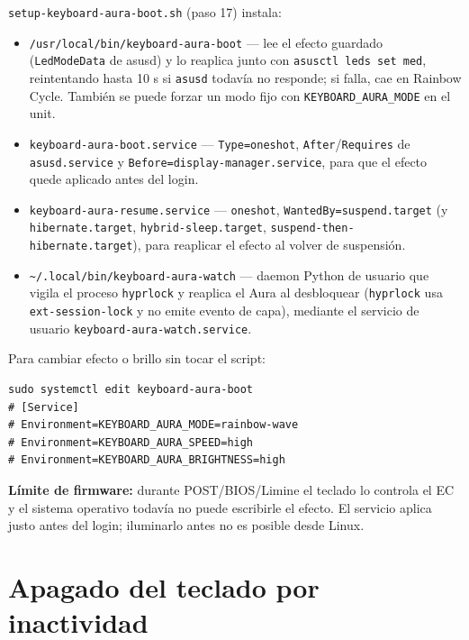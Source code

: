 \documentclass[12pt,a4paper]{article}
\begin{document}
\texttt{setup-keyboard-aura-boot.sh} (paso 17) instala:

\begin{itemize}[nosep]
  \item \texttt{/usr/local/bin/keyboard-aura-boot} — lee el efecto guardado
        (\texttt{LedModeData} de asusd) y lo reaplica junto con
        \texttt{asusctl leds set med}, reintentando hasta 10 s si \texttt{asusd}
        todavía no responde; si falla, cae en Rainbow Cycle. También se puede
        forzar un modo fijo con \texttt{KEYBOARD\_AURA\_MODE} en el unit.
  \item \texttt{keyboard-aura-boot.service} — \texttt{Type=oneshot},
        \texttt{After}/\texttt{Requires} de \texttt{asusd.service} y
        \texttt{Before=display-manager.service}, para que el efecto quede
        aplicado antes del login.
  \item \texttt{keyboard-aura-resume.service} — \texttt{oneshot},
        \texttt{WantedBy=suspend.target} (y \texttt{hibernate.target},
        \texttt{hybrid-sleep.target}, \texttt{suspend-then-hibernate.target}),
        para reaplicar el efecto al volver de suspensión.
  \item \texttt{\textasciitilde/.local/bin/keyboard-aura-watch} — daemon Python
        de usuario que vigila el proceso \texttt{hyprlock} y reaplica el Aura
        al desbloquear (\texttt{hyprlock} usa \texttt{ext-session-lock} y no
        emite evento de capa), mediante el servicio de usuario
        \texttt{keyboard-aura-watch.service}.
\end{itemize}

Para cambiar efecto o brillo sin tocar el script:

\begin{lstlisting}[style=bash]
sudo systemctl edit keyboard-aura-boot
# [Service]
# Environment=KEYBOARD_AURA_MODE=rainbow-wave
# Environment=KEYBOARD_AURA_SPEED=high
# Environment=KEYBOARD_AURA_BRIGHTNESS=high
\end{lstlisting}

\textbf{Límite de firmware:} durante POST/BIOS/Limine el teclado lo controla el
EC y el sistema operativo todavía no puede escribirle el efecto. El servicio
aplica justo antes del login; iluminarlo antes no es posible desde Linux.

\section{Apagado del teclado por inactividad}
\end{document}
